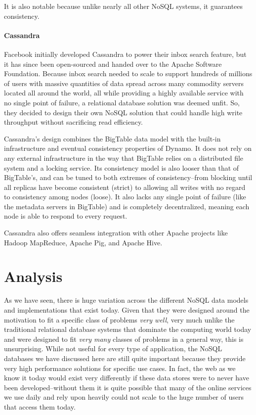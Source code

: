 \documentclass[11pt,a4paper]{report}
\begin{document}
It is also notable because unlike nearly all other NoSQL systems, it guarantees consistency.
\cite{chang2008bigtable}

\paragraph{Cassandra}
Facebook initially developed Cassandra to power their inbox search feature, but it has since been open-sourced and handed over to the Apache Software Foundation.\cite{lakshman2010cassandra,featherston2010cassandra} Because inbox search needed to scale to support hundreds of millions of users with massive quantities of data spread across many commodity servers located all around the world, all while providing a highly available service with no single point of failure, a relational database solution was deemed unfit. So, they decided to design their own NoSQL solution that could handle high write throughput without sacrificing read efficiency.\cite{lakshman2010cassandra}

Cassandra's design combines the BigTable data model with the built-in infrastructure and eventual consistency properties of Dynamo.\cite{featherston2010cassandra} It does not rely on any external infrastructure in the way that BigTable relies on a distributed file system and a locking service. Its consistency model is also looser than that of BigTable's, and can be tuned to both extremes of consistency--from blocking until all replicas have become consistent (strict) to allowing all writes with no regard to consistency among nodes (loose). It also lacks any single point of failure (like the metadata servers in BigTable) and is completely decentralized, meaning each node is able to respond to every request.

Cassandra also offers seamless integration with other Apache projects like Hadoop MapReduce, Apache Pig, and Apache Hive.


\section{Analysis}
As we have seen, there is huge variation across the different NoSQL data models and implementations that exist today. Given that they were designed around the motivation to fit a specific class of problems \textit{very well}, very much unlike the traditional relational database systems that dominate the computing world today and were designed to fit \textit{very many} classes of problems in a general way, this is unsurprising. While not useful for every type of application, the NoSQL databases we have discussed here are still quite important because they provide very high performance solutions for specific use cases. In fact, the web as we know it today would exist very differently if these data stores were to never have been developed--without them it is quite possible that many of the online services we use daily and rely upon heavily could not scale to the huge number of users that access them today. 
\end{document}
